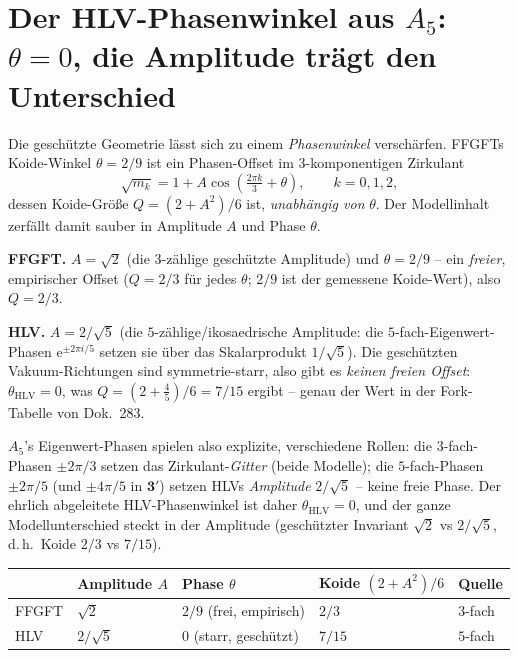 \section{Der HLV-Phasenwinkel aus $A_5$: $\theta=0$, die Amplitude tr\"agt den Unterschied}
Die gesch\"utzte Geometrie l\"asst sich zu einem \emph{Phasenwinkel} versch\"arfen. FFGFTs
Koide-Winkel $\theta=2/9$ ist ein Phasen-Offset im $3$-komponentigen Zirkulant
\begin{equation}
\sqrt{m_k} = 1 + A\cos\!\left(\tfrac{2\pi k}{3}+\theta\right),\qquad k=0,1,2,
\end{equation}
dessen Koide-Gr\"o\ss e $Q=(2+A^2)/6$ ist, \emph{unabh\"angig von} $\theta$. Der Modellinhalt
zerf\"allt damit sauber in Amplitude $A$ und Phase $\theta$.

\textbf{FFGFT.} $A=\sqrt2$ (die $3$-z\"ahlige gesch\"utzte Amplitude) und $\theta=2/9$ --
ein \emph{freier}, empirischer Offset ($Q=2/3$ f\"ur jedes $\theta$; $2/9$ ist der gemessene
Koide-Wert), also $Q=2/3$.

\textbf{HLV.} $A=2/\sqrt5$ (die $5$-z\"ahlige/ikosaedrische Amplitude: die $5$-fach-Eigenwert-Phasen
$\mathrm e^{\pm2\pi i/5}$ setzen sie \"uber das Skalarprodukt $1/\sqrt5$). Die gesch\"utzten
Vakuum-Richtungen sind symmetrie-starr, also gibt es \emph{keinen freien Offset}:
$\theta_{\mathrm{HLV}}=0$, was $Q=(2+\tfrac45)/6=7/15$ ergibt -- genau der Wert in der
Fork-Tabelle von Dok.~283.

$A_5$'s Eigenwert-Phasen spielen also explizite, verschiedene Rollen: die $3$-fach-Phasen
$\pm2\pi/3$ setzen das Zirkulant-\emph{Gitter} (beide Modelle); die $5$-fach-Phasen
$\pm2\pi/5$ (und $\pm4\pi/5$ in $\mathbf 3'$) setzen HLVs \emph{Amplitude} $2/\sqrt5$ --
keine freie Phase. Der ehrlich abgeleitete HLV-Phasenwinkel ist daher
$\theta_{\mathrm{HLV}}=0$, und der ganze Modellunterschied steckt in der Amplitude
(gesch\"utzter Invariant $\sqrt2$ vs $2/\sqrt5$, d.\,h.\ Koide $2/3$ vs $7/15$).

\begin{center}\small
\renewcommand{\arraystretch}{1.2}
\begin{tabular}{@{}p{1.8cm} p{1.7cm} p{3.4cm} p{2.4cm} p{1.6cm}@{}}
\toprule
 & Amplitude $A$ & Phase $\theta$ & Koide $(2{+}A^2)/6$ & Quelle \\
\midrule
FFGFT & $\sqrt2$ & $2/9$ (frei, empirisch) & $2/3$ & $3$-fach \\
HLV & $2/\sqrt5$ & $0$ (starr, gesch\"utzt) & $7/15$ & $5$-fach \\
\bottomrule
\end{tabular}
\end{center}

